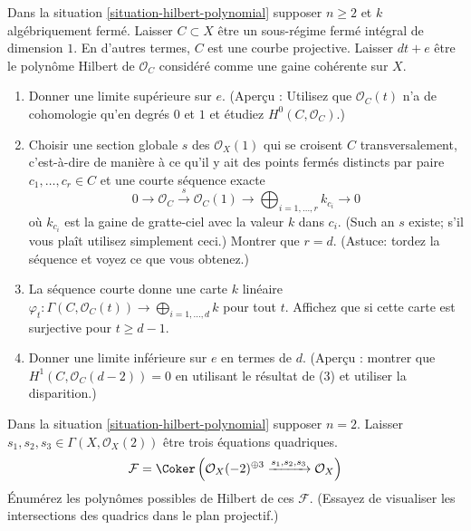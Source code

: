 \begin{exercise}
\label{exercise-bound-genus-in-degree}
Dans la situation \ref{situation-hilbert-polynomial} supposer $n \geq 2$ et $k$ algébriquement
fermé. Laisser $C \subset X$
être un sous-régime fermé intégral de dimension $1$. En d'autres termes,
$C$ est une courbe projective. Laisser $d
t + e$ être le polynôme Hilbert de $\mathcal{O}_C$ considéré
comme une gaine cohérente sur $X$.
\begin{enumerate}
\item Donner une limite supérieure sur $e$. (Aperçu
: Utilisez que $\mathcal{O}_C(t)$ n'a de cohomologie qu'en degrés $0$
et $1$ et étudiez $H^0(C, \mathcal{O}_C)$.)
\item Choisir une section globale $s$ des $\mathcal{O}_X(1)$ qui se
croisent $C$ transversalement, c'est-à-dire de manière à ce qu'il y ait
des points fermés distincts par paire $c_1, \ldots, c_r \in C$ et
une courte séquence exacte
$$
0 \to \mathcal{O}_C \xrightarrow{s} \mathcal{O}_C(1) \to
\bigoplus\nolimits_{i = 1, \ldots, r} k_{c_i} \to 0
$$
où $k_{c_i}$ est la gaine de gratte-ciel avec la valeur $k$ dans $c_i$. (Such
an $s$ existe; s'il vous plaît utilisez simplement ceci.)
Montrer que $r = d$. (Astuce: tordez la séquence et voyez ce que vous obtenez.)
\item La séquence courte donne une carte $k$ linéaire $\varphi_t :
\Gamma(C, \mathcal{O}_C(t)) \to \bigoplus_{i = 1, \ldots, d} k$ pour tout $t$. Affichez
que si cette carte est surjective pour $t \geq d - 1$.
\item Donner une limite inférieure sur $e$ en termes de $d$. (Aperçu : montrer
que $H^1(C, \mathcal{O}_C(d - 2)) = 0$ en utilisant le résultat de (3) et utiliser
la disparition.)
\end{enumerate}
\end{exercise}

\begin{exercise}
\label{exercise-three-quadrics-in-plane}
Dans la situation \ref{situation-hilbert-polynomial} supposer $n =
2$. Laisser $s_1, s_2, s_3 \in \Gamma(X,
\mathcal{O}_X(2))$ être trois équations quadriques.
$$
\mathcal{F} = \Coker\left(\mathcal{O}_X(-2)^{\oplus 3}
\xrightarrow{s_1, s_2, s_3} \mathcal{O}_X\right)
$$
Énumérez les polynômes possibles de Hilbert de ces $\mathcal{F}$.
(Essayez de visualiser les intersections des quadrics dans le plan projectif.)
\end{exercise}





